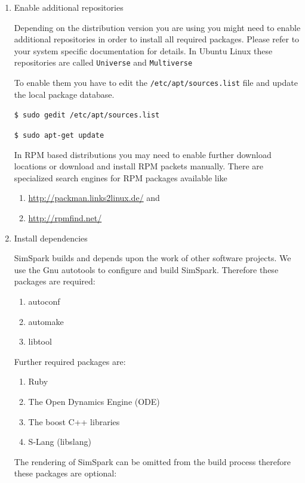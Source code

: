 \begin{enumerate}

\item Enable additional repositories

Depending on the distribution version you are using you might need to
enable additional repositories in order to install all required
packages. Please refer to your system specific documentation for
details. In Ubuntu Linux these repositories are called
\texttt{Universe} and
\texttt{Multiverse}

To enable them you have to edit the \texttt{/etc/apt/sources.list}
file and update the local package database.

\texttt{\$ sudo gedit /etc/apt/sources.list}


\texttt{\$ sudo apt-get update}


In RPM based distributions you may need to enable further download
locations or download and install RPM packets manually. There are
specialized search engines for RPM packages available like 

\begin{enumerate}
\item\url{http://packman.links2linux.de/} and
\item\url{http://rpmfind.net/}
\end{enumerate}

\item Install dependencies

SimSpark builds and depends upon the work of other software
projects. We use the Gnu autotools to configure and build
SimSpark. Therefore these packages are required:

\begin{enumerate}
\item autoconf
\item automake
\item libtool
\end{enumerate}

Further required packages are:

\begin{enumerate}
\item Ruby
\item The Open Dynamics Engine (ODE)
\item The boost C++ libraries
\item S-Lang (libslang)
\end{enumerate}

The rendering of SimSpark can be omitted from the build process
therefore these packages are optional:


\end{enumerate}
